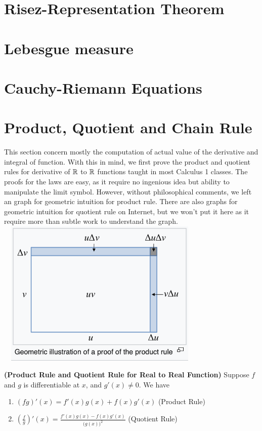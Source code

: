 \documentclass{report}
\begin{document}
\section{Risez-Representation Theorem}
\section{Lebesgue measure}


\section{Cauchy-Riemann Equations}
\section{Product, Quotient and Chain Rule}
\begin{mdframed}
This section concern mostly the computation of actual value of the derivative and integral of function. With this in mind, we first prove the product and quotient rules for derivative of $\mathbb{R}$ to  $\mathbb{R}$ functions taught in most Calculus 1 classes. The proofs for the laws are easy, as it require no ingenious idea but ability to manipulate the limit symbol. However, without philosophical comments, we left an graph for geometric intuition for product rule. There are also graphs for geometric intuition for quotient rule on Internet, but we won't put it here as it require more than subtle work to understand the graph.    
\includegraphics[height=7cm,width=10cm]{product rule.png}
\end{mdframed}
\label{11}
\begin{theorem}
\textbf{(Product Rule and Quotient Rule for Real to Real Function)} Suppose $f$ and $g$ is differentiable at  $x$, and $g'(x)\neq 0$. We have 
\label{3}
\begin{enumerate}[label=(\alph*)]
  \item $(fg)'(x)=f'(x)g(x)+f(x)g'(x)$ (Product Rule)
  \item $(\frac{f}{g})'(x)=\frac{f'(x)g(x)-f(x)g'(x)}{\big(g(x) \big)^2}$ (Quotient Rule)
\end{enumerate}
\end{theorem}
\end{document}
